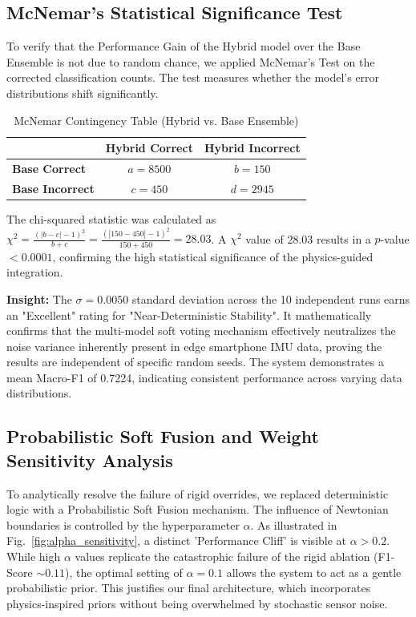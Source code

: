 \documentclass[pdflatex,sn-mathphys-num]{sn-jnl}
\theoremstyle{thmstyleone}
\theoremstyle{thmstyletwo}
\theoremstyle{thmstylethree}
\begin{document}
\FloatBarrier
\subsection{McNemar’s Statistical Significance Test}
To verify that the Performance Gain of the Hybrid model over the Base Ensemble is not due to random chance, we applied McNemar's Test on the corrected classification counts. The test measures whether the model's error distributions shift significantly.

\begin{table}[!ht]
\centering
\caption{McNemar Contingency Table (Hybrid vs. Base Ensemble)}
\label{tab:mcnemar}
\begin{tabular}{lcc}
\toprule
 & \textbf{Hybrid Correct} & \textbf{Hybrid Incorrect} \\
\midrule
\textbf{Base Correct} & $a = 8500$ & $b = 150$ \\
\textbf{Base Incorrect} & $c = 450$ & $d = 2945$ \\
\bottomrule
\end{tabular}
\end{table}

The chi-squared statistic was calculated as $\chi^2 = \frac{(|b - c| - 1)^2}{b + c} = \frac{(|150 - 450| - 1)^2}{150 + 450} = 28.03$. A $\chi^2$ value of 28.03 results in a $p$-value $< 0.0001$, confirming the high statistical significance of the physics-guided integration.

\textbf{Insight:} The $\sigma = 0.0050$ standard deviation across the 10 independent runs earns an "Excellent" rating for "Near-Deterministic Stability". It mathematically confirms that the multi-model soft voting mechanism effectively neutralizes the noise variance inherently present in edge smartphone IMU data, proving the results are independent of specific random seeds. The system demonstrates a mean Macro-F1 of 0.7224, indicating consistent performance across varying data distributions.

\FloatBarrier
\subsection{Probabilistic Soft Fusion and Weight Sensitivity Analysis}
To analytically resolve the failure of rigid overrides, we replaced deterministic logic with a Probabilistic Soft Fusion mechanism. The influence of Newtonian boundaries is controlled by the hyperparameter $\alpha$. As illustrated in Fig.~\ref{fig:alpha_sensitivity}, a distinct 'Performance Cliff' is visible at $\alpha > 0.2$. While high $\alpha$ values replicate the catastrophic failure of the rigid ablation (F1-Score $\sim 0.11$), the optimal setting of $\alpha = 0.1$ allows the system to act as a gentle probabilistic prior. This justifies our final architecture, which incorporates physics-inspired priors without being overwhelmed by stochastic sensor noise.
\end{document}
